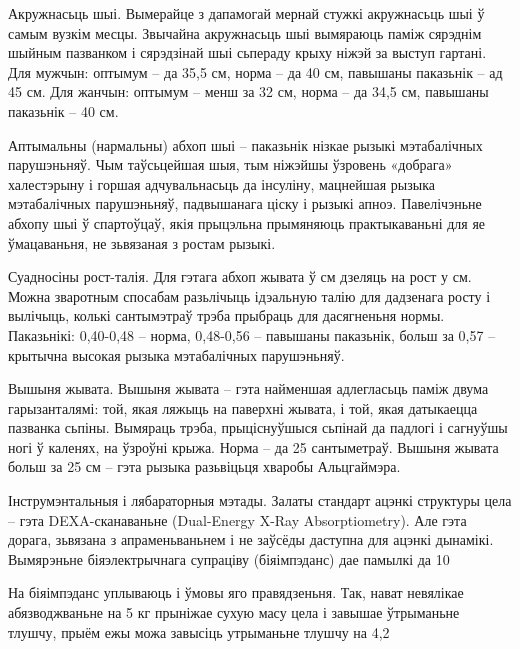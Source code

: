 Акружнасьць шыі. Вымерайце з дапамогай мернай стужкі акружнасьць шыі ў самым вузкім месцы. Звычайна акружнасьць шыі вымяраюць паміж сярэднім шыйным пазванком і сярэдзінай шыі сьпераду крыху ніжэй за выступ гартані. Для мужчын: оптымум – да 35,5 см, норма – да 40 см, павышаны паказьнік – ад 45 см. Для жанчын: оптымум – менш за 32 см, норма – да 34,5 см, павышаны паказьнік – 40 см.

Аптымальны (нармальны) абхоп шыі – паказьнік нізкае рызыкі мэтабалічных парушэньняў. Чым таўсьцейшая шыя, тым ніжэйшы ўзровень «добрага» халестэрыну і горшая адчувальнасьць да інсуліну, мацнейшая рызыка мэтабалічных парушэньняў, падвышанага ціску і рызыкі апноэ. Павелічэньне абхопу шыі ў спартоўцаў, якія прыцэльна прымяняюць практыкаваньні для яе ўмацаваньня, не зьвязаная з ростам рызыкі.

Суадносіны рост-талія. Для гэтага абхоп жывата ў см дзеляць на рост у см. Можна зваротным спосабам разьлічыць ідэальную талію для дадзенага росту і вылічыць, колькі сантымэтраў трэба прыбраць для дасягненьня нормы. Паказьнікі: 0,40-0,48 – норма, 0,48-0,56 – павышаны паказьнік, больш за 0,57 – крытычна высокая рызыка мэтабалічных парушэньняў.

Вышыня жывата. Вышыня жывата – гэта найменшая адлегласьць паміж двума гарызанталямі: той, якая ляжыць на паверхні жывата, і той, якая датыкаецца пазванка сьпіны. Вымяраць трэба, прыціснуўшыся сьпінай да падлогі і сагнуўшы ногі ў каленях, на ўзроўні крыжа. Норма – да 25 сантыметраў. Вышыня жывата больш за 25 см – гэта рызыка разьвіцьця хваробы Альцгаймэра.

Інструмэнтальныя і лябараторныя мэтады. Залаты стандарт ацэнкі структуры цела – гэта DEXA-сканаваньне (Dual-Energy X-Ray Absorptiometry). Але гэта дорага, зьвязана з апраменьваньнем і не заўсёды даступна для ацэнкі дынамікі. Вымярэньне біяэлектрычнага супраціву (біяімпэданс) дае памылкі да 10%

На біяімпэданс уплываюць і ўмовы яго правядзеньня. Так, нават невялікае абязводжваньне на 5 кг прыніжае сухую масу цела і завышае ўтрыманьне тлушчу, прыём ежы можа завысіць утрыманьне тлушчу на 4,2%

